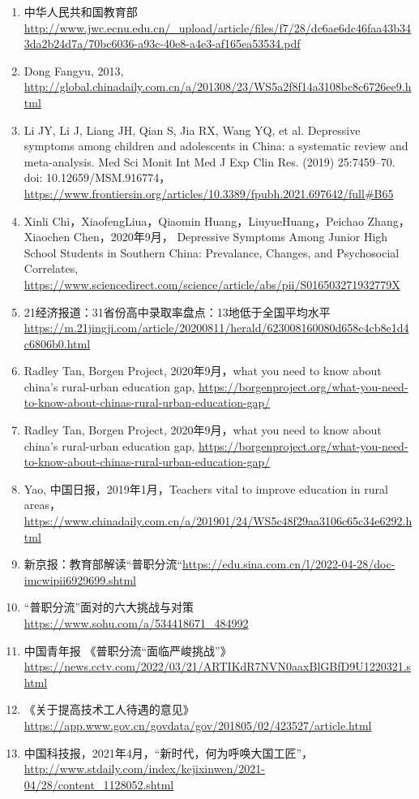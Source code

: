 \documentclass[12pt,UTF8]{ctexart}
\begin{document}
\begin{enumerate}[1.]
\item 中华人民共和国教育部\url{http://www.jwc.ecnu.edu.cn/_upload/article/files/f7/28/dc6ae6dc46faa43b343da2b24d7a/70bc6036-a93c-40e8-a4e3-af165ea53534.pdf}
\item Dong Fangyu, 2013, \url{http://global.chinadaily.com.cn/a/201308/23/WS5a2f8f14a3108bc8c6726ee9.html}
\item Li JY, Li J, Liang JH, Qian S, Jia RX, Wang YQ, et al. Depressive symptoms among children and adolescents in China: a systematic review and meta-analysis. Med Sci Monit Int Med J Exp Clin Res. (2019) 25:7459–70. doi: 10.12659/MSM.916774，\url{https://www.frontiersin.org/articles/10.3389/fpubh.2021.697642/full#B65}
\item Xinli Chi，XiaofengLiua，Qiaomin Huang，LiuyueHuang，Peichao Zhang，Xiaochen Chen，2020年9月， Depressive Symptoms Among Junior High School Students in Southern China: Prevalance, Changes, and Psychosocial Correlates, \url{https://www.sciencedirect.com/science/article/abs/pii/S016503271932779X}
\item 21经济报道：31省份高中录取率盘点：13地低于全国平均水平\url{https://m.21jingji.com/article/20200811/herald/623008160080d658c4cb8e1d4c6806b0.html}
\item Radley Tan, Borgen Project, 2020年9月，what you need to know about china's rural-urban education gap, \url{https://borgenproject.org/what-you-need-to-know-about-chinas-rural-urban-education-gap/}
\item Radley Tan, Borgen Project, 2020年9月，what you need to know about china's rural-urban education gap, \url{https://borgenproject.org/what-you-need-to-know-about-chinas-rural-urban-education-gap/}
\item Yao, 中国日报，2019年1月，Teachers vital to improve education in rural areas，\url{https://www.chinadaily.com.cn/a/201901/24/WS5c48f29aa3106c65c34e6292.html}
\item 新京报：教育部解读“普职分流“\url{https://edu.sina.com.cn/l/2022-04-28/doc-imcwipii6929699.shtml}
\item “普职分流”面对的六大挑战与对策\url{https://www.sohu.com/a/534418671_484992}
\item 中国青年报 《普职分流“面临严峻挑战”》\url{https://news.cctv.com/2022/03/21/ARTIKdR7NVN0aaxBlGBfD9U1220321.shtml}
\item 《关于提高技术工人待遇的意见》\url{https://app.www.gov.cn/govdata/gov/201805/02/423527/article.html}
\item 中国科技报，2021年4月，“新时代，何为呼唤大国工匠”，\url{http://www.stdaily.com/index/kejixinwen/2021-04/28/content_1128052.shtml}

\end{enumerate}
\end{document}
